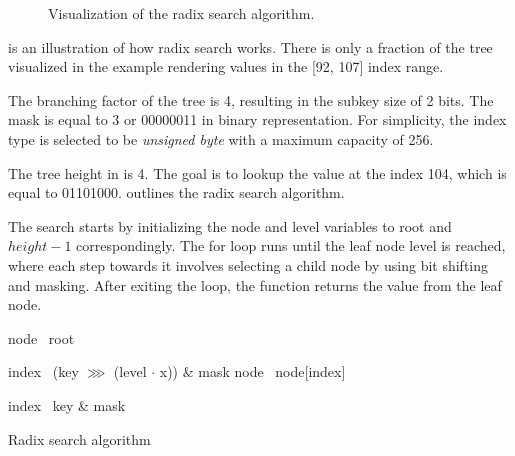 \begin{figure}[!ht]

    \caption{Visualization of the radix search algorithm.}
    \label{fig:rb-tree-example-1}
\end{figure}

 is an illustration of how radix search works. There is only a fraction of the tree visualized in the example rendering values in the [92, 107] index range.

The branching factor of the tree is 4, resulting in the subkey size of 2 bits. The mask is equal to 3 or 00000011 in binary representation. For simplicity, the index type is selected to be \emph{unsigned byte} with a maximum capacity of 256.

The tree height in  is 4. The goal is to lookup the value at the index 104, which is equal to 01101000.  outlines the radix search algorithm.

The search starts by initializing the node and level variables to root and $height - 1$ correspondingly. The for loop runs until the leaf node level is reached, where each step towards it involves selecting a child node by using bit shifting and masking. After exiting the loop, the function returns the value from the leaf node.

\begin{listing}[ht!]

    \begin{algorithmic}[1]
            \State node \la\ root

                \State index \la\ (key $\ggg$ (level $\cdot$ x)) \& mask
                \State node \la\ node[index]
            \EndFor

            \State index \la\ key \& mask
            \State {}
        \EndFunction
    \end{algorithmic}

    \caption{Radix search algorithm}
    \label{lst:rb-tree-radix-search}
\end{listing}

